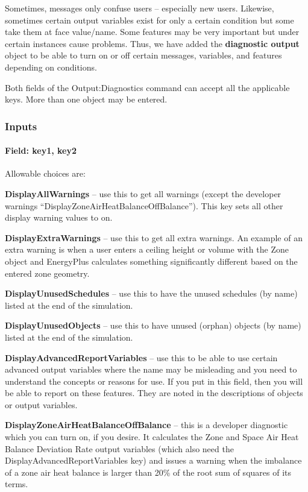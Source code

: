 Sometimes, messages only confuse users -- especially new users. Likewise, sometimes certain output variables exist for only a certain condition but some take them at face value/name. Some features may be very important but under certain instances cause problems. Thus, we have added the \textbf{diagnostic output} object to be able to turn on or off certain messages, variables, and features depending on conditions.

Both fields of the Output:Diagnostics command can accept all the applicable keys. More than one object may be entered.

\subsubsection{Inputs}\label{inputs-11-018}

\paragraph{Field: key1, key2}\label{field-key1-key2}

Allowable choices are:

\textbf{DisplayAllWarnings} -- use this to get all warnings (except the developer warnings ``DisplayZoneAirHeatBalanceOffBalance''). This key sets all other display warning values to on.

\textbf{DisplayExtraWarnings} -- use this to get all extra warnings. An example of an extra warning is when a user enters a ceiling height or volume with the Zone object and EnergyPlus calculates something significantly different based on the entered zone geometry.

\textbf{DisplayUnusedSchedules} -- use this to have the unused schedules (by name) listed at the end of the simulation.

\textbf{DisplayUnusedObjects} -- use this to have unused (orphan) objects (by name) listed at the end of the simulation.

\textbf{DisplayAdvancedReportVariables} -- use this to be able to use certain advanced output variables where the name may be misleading and you need to understand the concepts or reasons for use. If you put in this field, then you will be able to report on these features. They are noted in the descriptions of objects or output variables.

\textbf{DisplayZoneAirHeatBalanceOffBalance} -- this is a developer diagnostic which you can turn on, if you desire. It calculates the Zone and Space Air Heat Balance Deviation Rate output variables (which also need the DisplayAdvancedReportVariables key) and issues a warning when the imbalance of a zone air heat balance is larger than 20\% of the root sum of squares of its terms.

